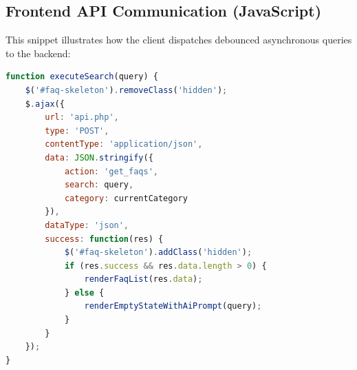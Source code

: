 \subsection{Frontend API Communication (JavaScript)}
This snippet illustrates how the client dispatches debounced asynchronous queries to the backend:

\begin{lstlisting}[language=JavaScript, caption=Debounced Search & Asynchronous API Request (index.html)]
function executeSearch(query) {
    $('#faq-skeleton').removeClass('hidden');
    $.ajax({
        url: 'api.php',
        type: 'POST',
        contentType: 'application/json',
        data: JSON.stringify({
            action: 'get_faqs',
            search: query,
            category: currentCategory
        }),
        dataType: 'json',
        success: function(res) {
            $('#faq-skeleton').addClass('hidden');
            if (res.success && res.data.length > 0) {
                renderFaqList(res.data);
            } else {
                renderEmptyStateWithAiPrompt(query);
            }
        }
    });
}
\end{lstlisting}
